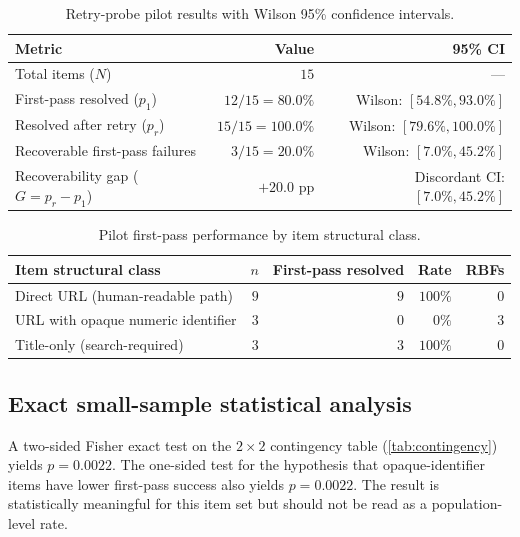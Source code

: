 \documentclass[11pt]{article}
\newcommand{\pone}{p_{1}}
\newcommand{\pr}{p_{r}}
\begin{document}
\begin{table}[h]
\centering\small
\caption{Retry-probe pilot results with Wilson 95\% confidence intervals.}
\label{tab:pilot}
\begin{tabularx}{\linewidth}{X r r}
\toprule
\textbf{Metric} & \textbf{Value} & \textbf{95\% CI} \\
\midrule
Total items ($N$)                                       & $15$                       & --- \\
First-pass resolved ($\pone$)                            & $12/15 = 80.0\%$           & Wilson: $[54.8\%, 93.0\%]$ \\
Resolved after retry ($\pr$)                             & $15/15 = 100.0\%$          & Wilson: $[79.6\%, 100.0\%]$ \\
Recoverable first-pass failures                          & $3/15 = 20.0\%$            & Wilson: $[7.0\%, 45.2\%]$ \\
Recoverability gap ($G = \pr - \pone$)                    & $+20.0$ pp                 & Discordant CI: $[7.0\%, 45.2\%]$ \\
\bottomrule
\end{tabularx}
\end{table}

\begin{table}[h]
\centering\small
\caption{Pilot first-pass performance by item structural class.}
\label{tab:byclass}
\begin{tabularx}{\linewidth}{X r r r r}
\toprule
\textbf{Item structural class} & \textbf{$n$} & \textbf{First-pass resolved} & \textbf{Rate} & \textbf{RBFs} \\
\midrule
Direct URL (human-readable path)        & $9$ & $9$  & $100\%$ & $0$ \\
URL with opaque numeric identifier      & $3$ & $0$  & $0\%$   & $3$ \\
Title-only (search-required)            & $3$ & $3$  & $100\%$ & $0$ \\
\bottomrule
\end{tabularx}
\end{table}

\subsection{Exact small-sample statistical analysis}
A two-sided Fisher exact test on the $2 \times 2$ contingency table (\cref{tab:contingency}) yields $p = 0.0022$. The one-sided test for the hypothesis that opaque-identifier items have lower first-pass success also yields $p = 0.0022$. The result is statistically meaningful for this item set but should not be read as a population-level rate.
\end{document}
